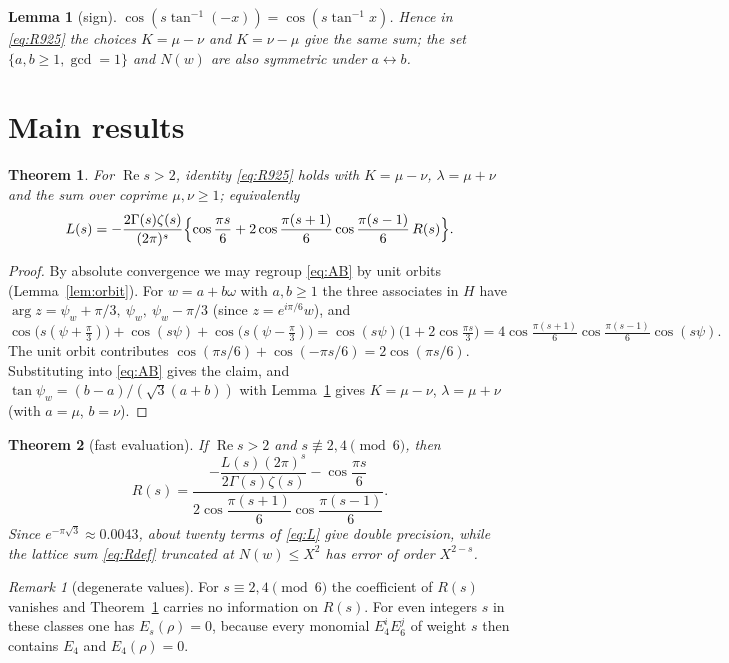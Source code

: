 \documentclass[11pt]{article}
\newtheorem{theorem}{Theorem}
\newtheorem{lemma}{Lemma}
\theoremstyle{remark}
\newtheorem{remark}{Remark}
\begin{document}
\begin{lemma}[sign]\label{lem:sign}
$\cos(s\tan^{-1}(-x))=\cos(s\tan^{-1}x)$. Hence in \eqref{eq:R925} the choices $K=\mu-\nu$ and $K=\nu-\mu$ give the same sum; the
set $\{a,b\ge1,\gcd=1\}$ and $N(w)$ are also symmetric under $a\leftrightarrow b$.
\end{lemma}

\section{Main results}
\begin{theorem}\label{thm:main}
For $\operatorname{Re}s>2$, identity \eqref{eq:R925} holds with $K=\mu-\nu$, $\lambda=\mu+\nu$ and the sum over coprime $\mu,\nu\ge1$;
equivalently
\[
L(s)=-\frac{2\Gamma(s)\zeta(s)}{(2\pi)^s}\Bigl\{\cos\frac{\pi s}{6}+2\cos\frac{\pi(s+1)}{6}\cos\frac{\pi(s-1)}{6}\,R(s)\Bigr\}.
\]
\end{theorem}
\begin{proof}
By absolute convergence we may regroup \eqref{eq:AB} by unit orbits (Lemma~\ref{lem:orbit}). For $w=a+b\omega$ with $a,b\ge1$ the three
associates in $H$ have $\arg z=\psi_w+\pi/3,\ \psi_w,\ \psi_w-\pi/3$ (since $z=e^{i\pi/6}w$), and
\[
\cos\bigl(s(\psi+\tfrac{\pi}{3})\bigr)+\cos(s\psi)+\cos\bigl(s(\psi-\tfrac{\pi}{3})\bigr)=\cos(s\psi)\bigl(1+2\cos\tfrac{\pi s}{3}\bigr)
=4\cos\tfrac{\pi(s+1)}{6}\cos\tfrac{\pi(s-1)}{6}\cos(s\psi).
\]
The unit orbit contributes $\cos(\pi s/6)+\cos(-\pi s/6)=2\cos(\pi s/6)$. Substituting into \eqref{eq:AB} gives the claim, and
$\tan\psi_w=(b-a)/(\sqrt3(a+b))$ with Lemma~\ref{lem:sign} gives $K=\mu-\nu$, $\lambda=\mu+\nu$ (with $a=\mu$, $b=\nu$).
\end{proof}

\begin{theorem}[fast evaluation]\label{thm:fast}
If $\operatorname{Re}s>2$ and $s\not\equiv2,4\pmod 6$, then
\[
R(s)=\frac{-\dfrac{L(s)(2\pi)^s}{2\Gamma(s)\zeta(s)}-\cos\dfrac{\pi s}{6}}{2\cos\dfrac{\pi(s+1)}{6}\cos\dfrac{\pi(s-1)}{6}}.
\]
Since $e^{-\pi\sqrt3}\approx0.0043$, about twenty terms of \eqref{eq:L} give double precision, while the lattice sum \eqref{eq:Rdef}
truncated at $N(w)\le X^2$ has error of order $X^{2-s}$.
\end{theorem}
\begin{remark}[degenerate values]
For $s\equiv2,4\pmod6$ the coefficient of $R(s)$ vanishes and Theorem~\ref{thm:main} carries no information on $R(s)$. For even
integers $s$ in these classes one has $E_s(\rho)=0$, because every monomial $E_4^iE_6^j$ of weight $s$ then contains $E_4$ and $E_4(\rho)=0$.
\end{remark}
\end{document}
